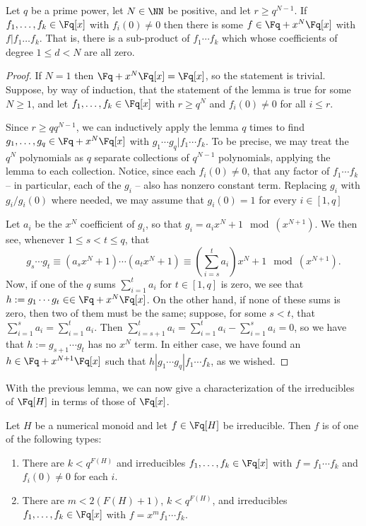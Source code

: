\begin{lemma}\label{lem:coefficient gap boosting}
Let $q$ be a prime power, let $N\in\NN$ be positive, and let $r \ge q^{N-1}$.
If $f_1,\dots,f_k\in \Fq[x]$ with $f_i(0)\neq 0$ then there is some $f\in \Fq + x^N \Fq[x]$ with $f | f_1\dots f_k$.
That is, there is a sub-product of $f_1\cdots f_k$ which whose coefficients of degree $1\le d < N$ are all zero.
\end{lemma}

\begin{proof}
If $N=1$ then $\Fq + x^N\Fq[x] = \Fq[x]$, so the statement is trivial.
Suppose, by way of induction, that the statement of the lemma is true for some $N\ge 1$, and let $f_1,\dots, f_k\in \Fq[x]$ with $r \ge q^N$ and $f_i(0)\neq0$ for all $i\le r$.

Since $r \ge q q^{N-1}$, we can inductively apply the lemma $q$ times to find $g_1,\dots,g_q\in \Fq + x^N \Fq[x]$ with $g_1\cdots g_q | f_1\cdots f_k$.
To be precise, we may treat the $q^N$ polynomials as $q$ separate collections of $q^{N-1}$ polynomials, applying the lemma to each collection.
Notice, since each $f_i(0) \neq 0$, that any factor of $f_1\cdots f_k$ -- in particular, each of the $g_i$ -- also has nonzero constant term.
Replacing $g_i$ with $g_i/g_i(0)$ where needed, we may assume that $g_i(0)=1$ for every $i\in [1,q]$

Let $a_i$ be the $x^N$ coefficient of $g_i$, so that $g_i = a_i x^N + 1 \mod (x^{N+1})$.
We then see, whenever $1\le s<t\le q$, that
\[ g_s\cdots g_t \equiv (a_s x^N + 1)\cdots(a_t x^N + 1) \equiv \left(\sum_{i=s}^t a_i\right) x^N + 1 \mod (x^{N+1}). \]
Now, if one of the $q$ sums $\sum_{i=1}^t a_i$ for $t\in [1,q]$ is zero, we see that $h := g_1\cdots g_t\in \in \Fq + x^N\Fq[x]$.
On the other hand, if none of these sums is zero, then two of them must be the same; suppose, for some $s<t$, that $\sum_{i=1}^s a_i = \sum_{i=1}^t a_i$.
Then $\sum_{i=s+1}^ta_i = \sum_{i=1}^t a_i - \sum_{i=1}^s a_i = 0$, so we have that $h := g_{s+1}\cdots g_t$ has no $x^N$ term.
In either case, we have found an $h\in \Fq + x^{N+1}\Fq[x]$ such that $h | g_1\cdots g_q | f_1\cdots f_k$, as we wished.
\end{proof}

With the previous lemma, we can now give a characterization of the irreducibles of $\Fq[H]$ in terms of those of $\Fq[x]$.

\begin{prop}\label{prop:num ring atom classification}
Let $H$ be a numerical monoid and let $f\in \Fq[H]$ be irreducible.
Then $f$ is of one of the following types:
\begin{enumerate}[label=(\rm \arabic{*})]
	\item There are $k< q^{F(H)}$ and irreducibles $f_1,\dots,f_k\in \Fq[x]$ with $f = f_1\cdots f_k$ and $f_i(0)\neq 0$ for each $i$.
	\item There are $m < 2(F(H)+1)$, $k < q^{F(H)}$, and irreducibles $f_1,\dots, f_k\in \Fq[x]$ with $f = x^m f_1\cdots f_k$.
\end{enumerate}
\end{prop}

